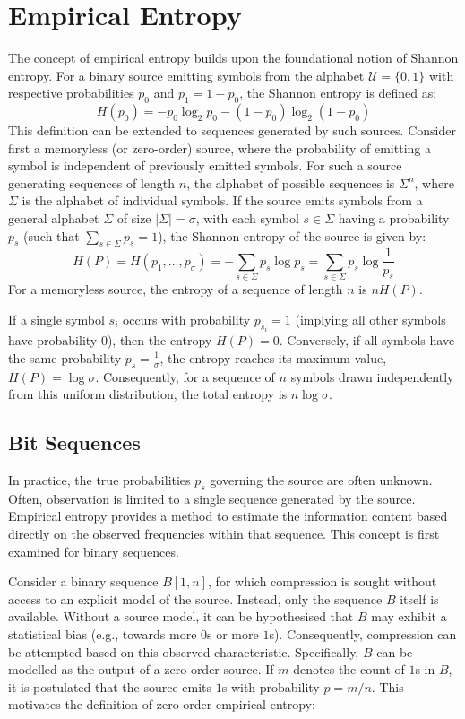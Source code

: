 \section{Empirical Entropy}
The concept of empirical entropy builds upon the foundational notion of Shannon entropy. For a binary source emitting symbols from the alphabet $\mathcal{U} = \{0, 1\}$ with respective probabilities $p_0$ and $p_1 = 1 - p_0$, the Shannon entropy is defined as:
\[
    H(p_0) = -p_0 \log_2 p_0 - (1 - p_0) \log_2 (1 - p_0)
\]
This definition can be extended to sequences generated by such sources. Consider first a memoryless (or zero-order) source, where the probability of emitting a symbol is independent of previously emitted symbols. For such a source generating sequences of length $n$, the alphabet of possible sequences is $\Sigma^n$, where $\Sigma$ is the alphabet of individual symbols. If the source emits symbols from a general alphabet $\Sigma$ of size $|\Sigma| = \sigma$, with each symbol $s \in \Sigma$ having a probability $p_s$ (such that $\sum_{s \in \Sigma} p_s = 1$), the Shannon entropy of the source is given by:
\[
    H(P) = H(p_1, \ldots, p_{\sigma}) = - \sum_{s \in \Sigma} p_s \log p_s = \sum_{s \in \Sigma} p_s \log \frac{1}{p_s}
\]
For a memoryless source, the entropy of a sequence of length $n$ is $n H(P)$.

\begin{remark}
    If a single symbol $s_i$ occurs with probability $p_{s_i}=1$ (implying all other symbols have probability 0), then the entropy $H(P) = 0$. Conversely, if all symbols have the same probability $p_s = \frac{1}{\sigma}$, the entropy reaches its maximum value, $H(P) = \log \sigma$. Consequently, for a sequence of $n$ symbols drawn independently from this uniform distribution, the total entropy is $n \log \sigma$.
\end{remark}

\subsection{Bit Sequences}
In practice, the true probabilities $p_s$ governing the source are often unknown. Often, observation is limited to a single sequence generated by the source. Empirical entropy provides a method to estimate the information content based directly on the observed frequencies within that sequence. This concept is first examined for binary sequences.

Consider a binary sequence $B[1, n]$, for which compression is sought without access to an explicit model of the source. Instead, only the sequence $B$ itself is available. Without a source model, it can be hypothesised that $B$ may exhibit a statistical bias (e.g., towards more $0$s or more $1$s). Consequently, compression can be attempted based on this observed characteristic. Specifically, $B$ can be modelled as the output of a zero-order source. If $m$ denotes the count of $1$s in $B$, it is postulated that the source emits $1$s with probability $p = m/n$. This motivates the definition of zero-order empirical entropy:

